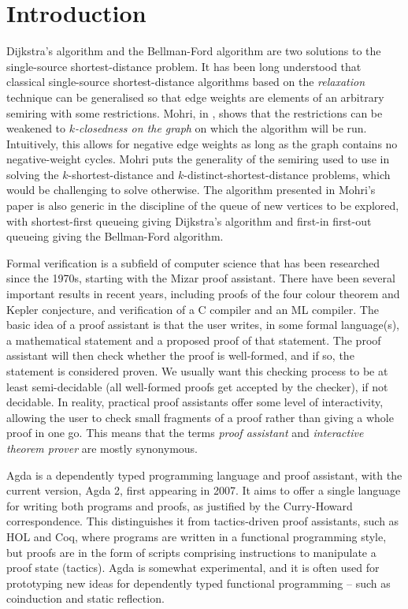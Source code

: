 \section*{Introduction}
Dijkstra's algorithm and the Bellman-Ford algorithm are two solutions to the single-source shortest-distance problem.
It has been long understood that classical single-source shortest-distance algorithms based on the \emph{relaxation} technique can be generalised so that edge weights are elements of an arbitrary semiring with some restrictions\cite{ahl74}.
Mohri, in \cite{Mohri02}, shows that the restrictions can be weakened to \emph{$k$-closedness on the graph} on which the algorithm will be run.
Intuitively, this allows for negative edge weights as long as the graph contains no negative-weight cycles.
Mohri puts the generality of the semiring used to use in solving the $k$-shortest-distance and $k$-distinct-shortest-distance problems, which would be challenging to solve otherwise.
The algorithm presented in Mohri's paper is also generic in the discipline of the queue of new vertices to be explored, with shortest-first queueing giving Dijkstra's algorithm and first-in first-out queueing giving the Bellman-Ford algorithm.

Formal verification is a subfield of computer science that has been researched since the 1970s\cite{DBLP:conf/aisc/2008}, starting with the Mizar proof assistant\cite{Naumowicz2009}.
There have been several important results in recent years, including proofs of the four colour theorem\cite{4-colour} and Kepler conjecture\cite{Hales-Kepler}, and verification of a C compiler\cite{Leroy-Compcert-CACM} and an ML compiler\cite{CakeML}.
The basic idea of a proof assistant is that the user writes, in some formal language(s), a mathematical statement and a proposed proof of that statement.
The proof assistant will then check whether the proof is well-formed, and if so, the statement is considered proven.
We usually want this checking process to be at least semi-decidable (all well-formed proofs get accepted by the checker), if not decidable.
In reality, practical proof assistants offer some level of interactivity, allowing the user to check small fragments of a proof rather than giving a whole proof in one go.
This means that the terms \emph{proof assistant} and \emph{interactive theorem prover} are mostly synonymous.

Agda is a dependently typed programming language and proof assistant, with the current version, Agda 2, first appearing in 2007\cite{Norell07}.
It aims to offer a single language for writing both programs and proofs, as justified by the Curry-Howard correspondence\cite{curry1980h}.
This distinguishes it from tactics-driven proof assistants, such as HOL and Coq, where programs are written in a functional programming style, but proofs are in the form of scripts comprising instructions to manipulate a proof state (tactics).
Agda is somewhat experimental, and it is often used for prototyping new ideas for dependently typed functional programming -- such as coinduction and static reflection.

